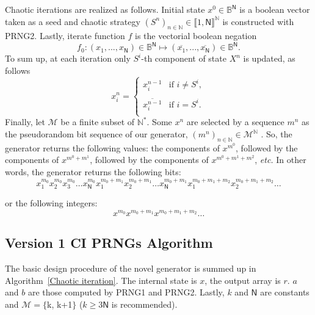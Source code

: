 Chaotic iterations are realized as follows. Initial state $x^0 \in \mathds{B}^\mathsf{N}$ is a boolean vector taken as a seed and chaotic strategy $\left(S^n\right)_{n\in\mathds{N}}\in \llbracket 1, \mathsf{N} \rrbracket^\mathds{N}$ is constructed with PRNG2. Lastly, iterate function $f$ is the vectorial boolean negation
$$f_0:(x_1,...,x_\mathsf{N}) \in \mathds{B}^\mathsf{N} \longmapsto (\overline{x_1},...,\overline{x_\mathsf{N}}) \in \mathds{B}^\mathsf{N}.$$
To sum up, at each iteration only $S^i$-th component of state $X^n$ is updated, as follows
\begin{equation}
x_i^n = \left\{\begin{array}{ll}x_i^{n-1} & \text{if } i \neq S^i, \\ \\ \overline{x_i^{n-1}} & \text{if } i = S^i. \\\end{array}\right.
\end{equation}
Finally, let $\mathcal{M}$ be a finite subset of $\mathds{N}^*$. Some $x^n$ are selected by a sequence $m^n$ as the pseudorandom bit sequence of our generator, $(m^n)_{n \in \mathds{N}} \in \mathcal{M}^\mathds{N}$ . So, the generator returns the following values: the components of $x^{m^0}$, followed by the components of $x^{m^0+m^1}$, followed by the components of $x^{m^0+m^1+m^2}$, \emph{etc.}
In other words, the generator returns the following bits:\newline
$$x_1^{m_0}x_2^{m_0}x_3^{m_0}\hdots x_\mathsf{N}^{m_0}x_1^{m_0+m_1}x_2^{m_0+m_1}\hdots x_\mathsf{N}^{m_0+m_1} x_1^{m_0+m_1+m_2}x_2^{m_0+m_1+m_2}\hdots$$

\noindent or the following integers:$$x^{m_0}x^{m_0+m_1}x^{m_0+m_1+m_2}\hdots$$
\subsection{Version 1 CI PRNGs Algorithm}
The basic design procedure of the novel generator is summed up in Algorithm~\ref{Chaotic iteration}.
The internal state is $x$, the output array is $r$. $a$ and $b$ are those computed by PRNG1 and PRNG2. Lastly, $k$ and $\mathsf{N}$ are constants and \linebreak $\mathcal{M}=\{$k, k+1$\}$ ($k\geqslant 3\mathsf{N}$ is recommended).


